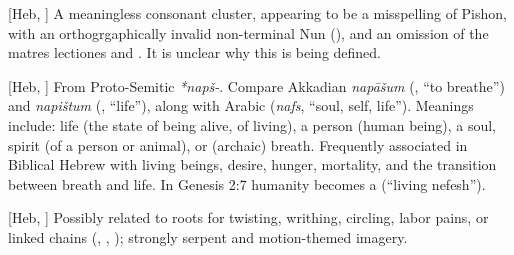 {
}
{
}
{
	[Heb, ]{
		A meaningless consonant cluster, appearing to be a misspelling of Pishon,
		with an orthogrgaphically invalid non-terminal Nun (), and an
		omission of the matres lectiones  and .
		It is unclear why this is being defined.
	}

	[Heb, ]{
		From Proto-Semitic \textit{*napš-}. Compare Akkadian \textit{napāšum} (, “to breathe”)
		and \textit{napištum} (, “life”), along with Arabic 
		(\textit{nafs}, “soul, self, life”).
		Meanings include: life (the state of being alive, of living),
		a person (human being), a soul, spirit (of a person or animal),
		or (archaic) breath. Frequently associated in Biblical Hebrew
		with living beings, desire, hunger, mortality, and the transition
		between breath and life. In Genesis 2:7 humanity becomes a 
		(“living nefesh”).
	}

	[Heb, ]{
	Possibly related to roots for twisting, writhing, circling, labor pains,
	or linked chains (, , );
	strongly serpent and motion-themed imagery.
	}

}

